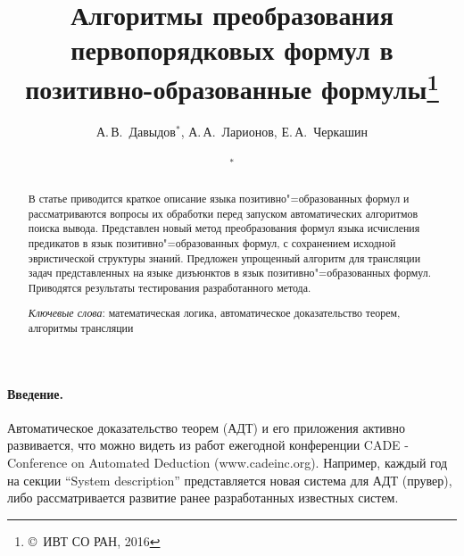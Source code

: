 \documentclass[a4paper]{jctart15b}
\begin{document}
\newtheorem{definition}{Определение}
\newtheorem{example}{Пример}

\newcommand{\fictAquantor}{\ensuremath{\forall\colon\varnothing}}
\newcommand{\fictEquantor}{\ensuremath{\exists\colon\varnothing}}
\newcommand{\bomega}{\boldsymbol{\omega}}
\newcommand{\bphi}{\boldsymbol{\phi}}
\newcommand{\eqdef}{\stackrel{\mathrm{df}}{=}}
\newcommand{\bigand}[2]{\raisebox{-2pt}{\ensuremath{\overset{#1}{\underset{#2}{\text{\Large\&\normalfont}}}}}}

\setcounter{page}{1}


\title{Алгоритмы преобразования первопорядковых формул в позитивно-образованные формулы\let\thefootnote\relax\footnote{\copyright\ ИВТ СО РАН, 2016}}

\author{
{\sc А.\,В.~Давыдов${}^*$, А.\,А.~Ларионов, Е.\,А.~Черкашин}\\
\\
$^*$
}

\date{}
\maketitle

\begin{abstract}
  В статье приводится краткое описание языка позитивно"=образованных формул и
  рассматриваются вопросы их обработки перед запуском автоматических алгоритмов поиска вывода. Представлен новый метод преобразования формул языка исчисления предикатов в язык позитивно"=образованных формул, с сохранением исходной эвристической структуры знаний. Предложен упрощенный алгоритм для трансляции задач представленных на языке дизъюнктов в язык позитивно"=образованных формул. Приводятся результаты тестирования разработанного метода.

    {\it Ключевые слова}: математическая логика, автоматическое доказательство теорем, алгоритмы трансляции
\end{abstract}

\paragraph{Введение.}

Автоматическое доказательство теорем (АДТ) и его приложения активно развивается, что можно видеть из работ ежегодной конференции CADE - Conference on Automated Deduction (www.cadeinc.org). Например, каждый год на секции “System description” представляется новая система для АДТ (прувер), либо рассматривается развитие ранее разработанных известных систем.
\end{document}
